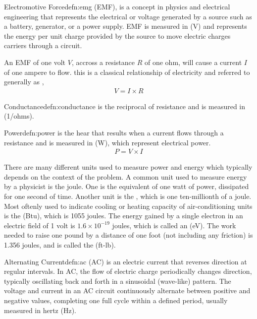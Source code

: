 \begin{defn}{Electromotive Force}{defn:emg}
 (EMF), is a concept in physics and electrical engineering that represents the electrical  or voltage generated by a source such as a battery, generator, or a power supply. EMF is measured in  (V) and represents the energy per unit charge provided by the source to move electric charges carriers through a circuit. 
\end{defn}

An EMF of one volt $V$, accross a resistance $R$ of one ohm, will cause a current $I$ of one ampere to flow. this is a classical relationship of electricity and referred to generally as ,
\begin{align}
V = I \times R
\end{align}

\begin{defn}{Conductance}{defn:conductance}
 is the reciprocal of resistance and is measured in  (1/ohms). 
\end{defn}

\begin{defn}{Power}{defn:power}
 is the hear that results when a current flows through a resistance and is measured in  (W), which represent electrical power.
\begin{align}
P = V \times I
\end{align}
\end{defn}

There are many different units used to measure power and energy which typically depends on the context of the problem. A common unit used to measure energy by a physicist is the joule. One  is the equivalent of one watt of power, dissipated for one second of time. Another unit is the , which is one ten-millionth of a joule. Most oftenly used to indicate cooling or heating capacity of air-conditioning units is the  (Btu), which is 1055 joules. The energy gained by a single electron in an electric field of 1 volt is $1.6 \times 10^{-19}$ joules, which is called an  (eV). The work needed to raise one pound by a distance of one foot (not including any friction) is 1.356 joules, and is called the  (ft-lb).

\begin{defn}{Alternating Current}{defn:ac}
 (AC) is an electric current that reverses direction at regular intervals. In AC, the flow of electric charge periodically changes direction, typically oscillating back and forth in a sinusoidal (wave-like) pattern. The voltage and current in an AC circuit continuously alternate between positive and negative values, completing one full cycle within a defined period, usually measured in hertz (Hz).
\end{defn}


